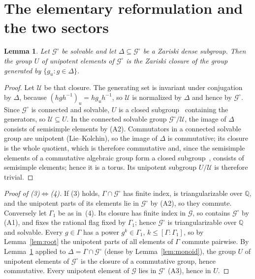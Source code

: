 \documentclass[acmlarge,screen,11pt,nonacm,natbib=false]{acmart}
\newcommand{\Q}{\mathbb{Q}}
\newcommand{\cG}{\mathcal{G}}
\newtheorem{lemma}[theorem]{Lemma}
\theoremstyle{definition}
\begin{document}
\section{The elementary reformulation and the two sectors}\label{sec:sectors}
\begin{lemma}\label{lem:Ugen}
Let $\cG^\circ$ be solvable and let $\Delta\subseteq\cG^\circ$ be a Zariski dense subgroup. Then the group $U$ of unipotent elements of $\cG^\circ$ is the Zariski closure of the group generated by $\{g_u:g\in\Delta\}$.
\end{lemma}
\begin{proof}
Let $\mathcal U$ be that closure. The generating set is invariant under conjugation by $\Delta$, because $(hgh^{-1})_u=hg_uh^{-1}$, so $\mathcal U$ is normalized by $\Delta$ and hence by $\cG^\circ$. Since $\cG^\circ$ is connected and solvable, $U$ is a closed subgroup~\cite[10.6]{Bor91} containing the generators, so $\mathcal U\subseteq U$. In the connected solvable group $\cG^\circ/\mathcal U$, the image of $\Delta$ consists of semisimple elements by (A2). Commutators in a connected solvable group are unipotent (Lie--Kolchin), so the image of $\Delta$ is commutative; its closure is the whole quotient, which is therefore commutative and, since the semisimple elements of a commutative algebraic group form a closed subgroup~\cite[4.7]{Bor91}, consists of semisimple elements; hence it is a torus. Its unipotent subgroup $U/\mathcal U$ is therefore trivial.
\end{proof}

\begin{proof}[Proof of (3)$\Leftrightarrow$(4)]
If (3) holds, $\Gamma\cap\cG^\circ$ has finite index, is triangularizable over $\Q$, and the unipotent parts of its elements lie in $\cG^\circ$ by (A2), so they commute. Conversely let $\Gamma_1$ be as in~(4). Its closure has finite index in $\cG$, so contains $\cG^\circ$ by (A1), and fixes the rational flag fixed by $\Gamma_1$; hence $\cG^\circ$ is triangularizable over $\Q$ and solvable. Every $g\in\Gamma$ has a power $g^k\in\Gamma_1$, $k\le[\Gamma:\Gamma_1]$, so by Lemma~\ref{lem:root} the unipotent parts of all elements of $\Gamma$ commute pairwise. By Lemma~\ref{lem:Ugen} applied to $\Delta=\Gamma\cap\cG^\circ$ (dense by Lemma~\ref{lem:monoid}), the group $U$ of unipotent elements of $\cG^\circ$ is the closure of a commutative group, hence commutative. Every unipotent element of $\cG$ lies in $\cG^\circ$ (A3), hence in $U$.
\end{proof}
\end{document}
